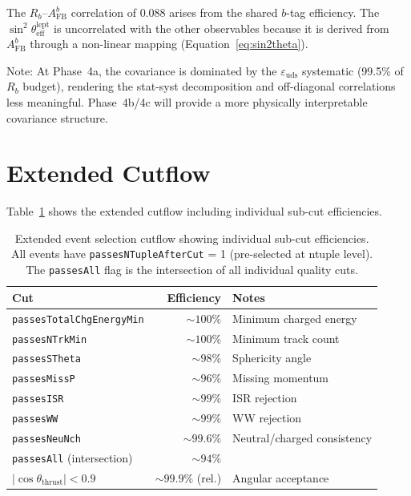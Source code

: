\documentclass[11pt,a4paper]{article}
\begin{document}
The $R_b$--$A_\mathrm{FB}^b$ correlation of 0.088 arises from the shared $b$-tag
efficiency. The $\sin^2\theta_\mathrm{eff}^\mathrm{lept}$ is uncorrelated with the
other observables because it is derived from $A_\mathrm{FB}^b$ through a non-linear
mapping (Equation~\ref{eq:sin2theta}).

Note: At Phase~4a, the covariance is dominated by the $\varepsilon_\mathrm{uds}$
systematic (99.5\% of $R_b$ budget), rendering the stat-syst decomposition and
off-diagonal correlations less meaningful. Phase~4b/4c will provide a more
physically interpretable covariance structure.

\section{Extended Cutflow}
\label{app:cutflow}

Table~\ref{tab:extended_cutflow} shows the extended cutflow including individual
sub-cut efficiencies.

\begin{table}[htbp]
\centering
\caption{Extended event selection cutflow showing individual sub-cut efficiencies.
All events have \texttt{passesNTupleAfterCut} = 1 (pre-selected at ntuple level).
The \texttt{passesAll} flag is the intersection of all individual quality cuts.}
\label{tab:extended_cutflow}
\begin{tabular}{lrl}
\toprule
Cut & Efficiency & Notes \\
\midrule
\texttt{passesTotalChgEnergyMin} & $\sim 100\%$ & Minimum charged energy \\
\texttt{passesNTrkMin} & $\sim 100\%$ & Minimum track count \\
\texttt{passesSTheta} & $\sim 98\%$ & Sphericity angle \\
\texttt{passesMissP} & $\sim 96\%$ & Missing momentum \\
\texttt{passesISR} & $\sim 99\%$ & ISR rejection \\
\texttt{passesWW} & $\sim 99\%$ & WW rejection \\
\texttt{passesNeuNch} & $\sim 99.6\%$ & Neutral/charged consistency \\
\texttt{passesAll} (intersection) & $\sim 94\%$ & \\
$|\cos\theta_\mathrm{thrust}| < 0.9$ & $\sim 99.9\%$ (rel.) & Angular acceptance \\
\bottomrule
\end{tabular}
\end{table}
\end{document}
